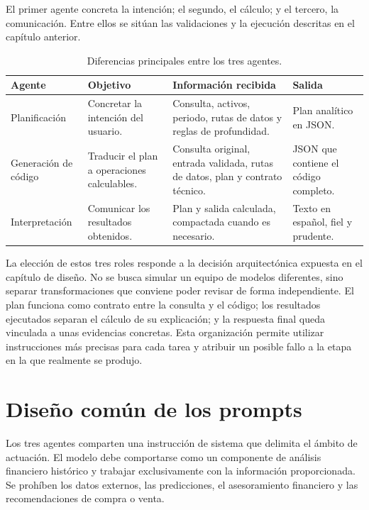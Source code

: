 El primer agente concreta la intención; el segundo, el cálculo; y el tercero, la comunicación. Entre ellos se sitúan las validaciones y la ejecución descritas en el capítulo anterior.

\begin{table}[H]
\centering
\small
\begin{tabularx}{\textwidth}{L{0.19\textwidth}L{0.25\textwidth}L{0.28\textwidth}Y}
\toprule
\textbf{Agente} & \textbf{Objetivo} & \textbf{Información recibida} & \textbf{Salida} \\
\midrule
Planificación & Concretar la intención del usuario. & Consulta, activos, periodo, rutas de datos y reglas de profundidad. & Plan analítico en JSON. \\
Generación de código & Traducir el plan a operaciones calculables. & Consulta original, entrada validada, rutas de datos, plan y contrato técnico. & JSON que contiene el código completo. \\
Interpretación & Comunicar los resultados obtenidos. & Plan y salida calculada, compactada cuando es necesario. & Texto en español, fiel y prudente. \\
\bottomrule
\end{tabularx}
\caption{Diferencias principales entre los tres agentes.}
\label{tab:diferencias_agentes}
\end{table}

La elección de estos tres roles responde a la decisión arquitectónica expuesta en el capítulo de diseño. No se busca simular un equipo de modelos diferentes, sino separar transformaciones que conviene poder revisar de forma independiente. El plan funciona como contrato entre la consulta y el código; los resultados ejecutados separan el cálculo de su explicación; y la respuesta final queda vinculada a unas evidencias concretas. Esta organización permite utilizar instrucciones más precisas para cada tarea y atribuir un posible fallo a la etapa en la que realmente se produjo.

\section{Diseño común de los prompts}

Los tres agentes comparten una instrucción de sistema que delimita el ámbito de actuación. El modelo debe comportarse como un componente de análisis financiero histórico y trabajar exclusivamente con la información proporcionada. Se prohíben los datos externos, las predicciones, el asesoramiento financiero y las recomendaciones de compra o venta.

